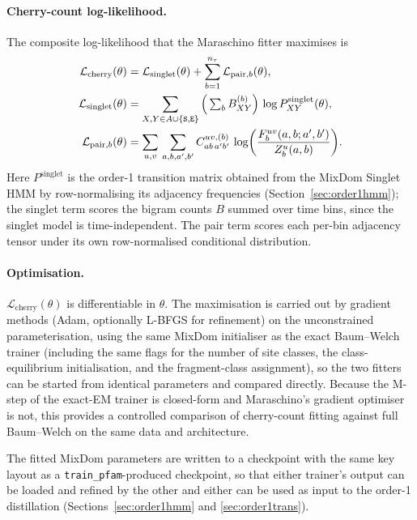 \paragraph{Cherry-count log-likelihood.}
The composite log-likelihood that the Maraschino fitter maximises is
\begin{align}
\mathcal{L}_{\text{cherry}}(\theta)
&= \mathcal{L}_{\text{singlet}}(\theta) + \sum_{b=1}^{n_\tau}
   \mathcal{L}_{\text{pair},b}(\theta), \\
\mathcal{L}_{\text{singlet}}(\theta)
&= \sum_{X,Y \in A \cup \{{\tt S},{\tt E}\}}
   \Big(\textstyle\sum_b B^{(b)}_{XY}\Big)\,
   \log P^{\text{singlet}}_{XY}(\theta), \\
\mathcal{L}_{\text{pair},b}(\theta)
&= \sum_{u,v}\,
   \sum_{a,b,a',b'}
   C^{uv,(b)}_{ab\,a'b'}\,
   \log\!\bigg(\frac{F^{uv}_b(a,b;a',b')}
                       {Z^{u}_b(a,b)}\bigg).
\label{eq:maraschino-pair-ll}
\end{align}
Here $P^{\text{singlet}}$ is the order-1 transition matrix obtained
from the MixDom Singlet HMM by row-normalising its adjacency frequencies
(Section~\ref{sec:order1hmm}); the singlet term scores the bigram
counts $B$ summed over time bins, since the singlet model is
time-independent. The pair term scores each per-bin adjacency tensor
under its own row-normalised conditional distribution.

\paragraph{Optimisation.}
$\mathcal{L}_{\text{cherry}}(\theta)$ is differentiable in
$\theta$. The maximisation is carried out by
gradient methods (Adam, optionally L-BFGS for refinement) on the
unconstrained parameterisation, using the same MixDom initialiser as
the exact Baum--Welch trainer (including the same flags for the number
of site classes, the class-equilibrium initialisation, and the
fragment-class assignment), so the two fitters can be started from
identical parameters and compared directly. Because the M-step of the
exact-EM trainer is closed-form and Maraschino's gradient optimiser
is not, this provides a controlled comparison of cherry-count fitting
against full Baum--Welch on the same data and architecture.

The fitted MixDom parameters are written to a checkpoint with the
same key layout as a \texttt{train\_pfam}-produced checkpoint, so that
either trainer's output can be loaded and refined by the other and
either can be used as input to the order-1 distillation
(Sections~\ref{sec:order1hmm} and \ref{sec:order1trans}).

